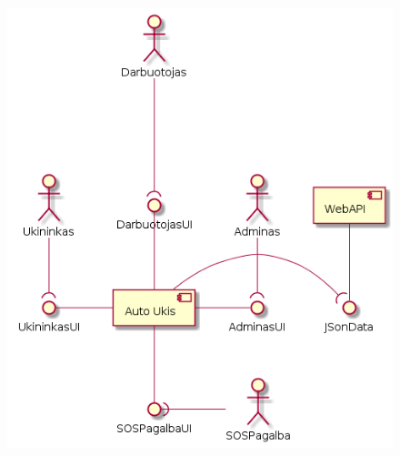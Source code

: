 \documentclass[oneside]{VUMIFPSkursinis}
\begin{document}
\begin{figure}[H]
		\centering	
	\includegraphics[width=17cm,height=20cm,keepaspectratio]{L0V2.png}
	\caption{}
	\label{fig:L0V2}
\end{figure}
\end{document}

